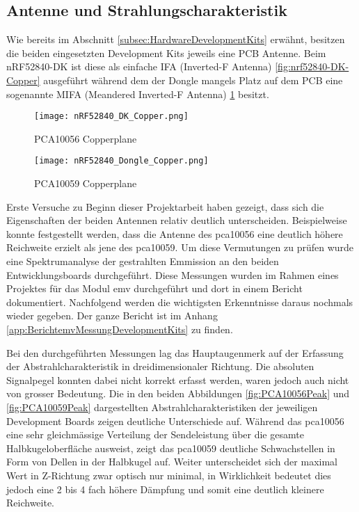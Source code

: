  
\subsection{Antenne und Strahlungscharakteristik}\label{subsec:AntenneundStrahlungscharakteristik}

Wie bereits im Abschnitt \ref{subsec:HardwareDevelopmentKits} erwähnt, besitzen die beiden eingesetzten Development Kits jeweils eine PCB Antenne. Beim nRF52840-DK ist diese als einfache IFA (Inverted-F Antenna) \ref{fig:nrf52840-DK-Copper} ausgeführt während dem der Dongle mangels Platz auf dem PCB eine sogenannte MIFA (Meandered Inverted-F Antenna) \ref{fig:nrf52840-Dongle-Copper} besitzt.

\begin{figure}[!htbp]
\centering
\begin{minipage}[b]{0.49\textwidth}
		\centering
		\texttt{[image: nRF52840\_DK\_Copper.png]}
		\caption[PCA10056 Copperplane mit IFA-Antenne]{PCA10056 Copperplane \cite{nordic_semiconductor_asa_pca10056_schematic_and_pcb_2019}}
		\label{fig:nrf52840-DK-Copper}
\end{minipage}
\begin{minipage}[b]{0.49\textwidth}
		\centering
		\texttt{[image: nRF52840\_Dongle\_Copper.png]}
		\caption[PCA10059 Copperplane mit MIFA-Antenne]{PCA10059 Copperplane \cite{nordic_semiconductor_asa_pca10059_schematic_and_pcb_2020}}
		\label{fig:nrf52840-Dongle-Copper}
\end{minipage}
\end{figure}

Erste Versuche zu Beginn dieser Projektarbeit haben gezeigt, dass sich die Eigenschaften der beiden Antennen relativ deutlich unterscheiden. Beispielweise konnte festgestellt werden, dass die Antenne des pca10056 eine deutlich höhere Reichweite erzielt als jene des pca10059.
Um diese Vermutungen zu prüfen wurde eine Spektrumanalyse der gestrahlten Emmission an den beiden Entwicklungsboards durchgeführt. Diese Messungen wurden im Rahmen eines Projektes für das Modul emv durchgeführt und dort in einem Bericht dokumentiert. Nachfolgend werden die wichtigsten Erkenntnisse daraus nochmals wieder gegeben. Der ganze Bericht ist im Anhang \ref{app:BerichtemvMessungDevelopmentKits} zu finden.

Bei den durchgeführten Messungen lag das Hauptaugenmerk auf der Erfassung der Abstrahlcharakteristik in dreidimensionaler Richtung. Die absoluten Signalpegel konnten dabei nicht korrekt erfasst werden, waren jedoch auch nicht von grosser Bedeutung.
Die in den beiden Abbildungen \ref{fig:PCA10056Peak} und \ref{fig:PCA10059Peak} dargestellten Abstrahlcharakteristiken der jeweiligen Development Boards zeigen deutliche Unterschiede auf. Während das pca10056 eine sehr gleichmässige Verteilung der Sendeleistung über die gesamte Halbkugeloberfläche ausweist, zeigt das pca10059 deutliche Schwachstellen in Form von Dellen in der Halbkugel auf.
Weiter unterscheidet sich der maximal Wert in Z-Richtung zwar optisch nur minimal, in Wirklichkeit bedeutet dies jedoch eine 2 bis 4 fach höhere Dämpfung und somit eine deutlich kleinere Reichweite.



